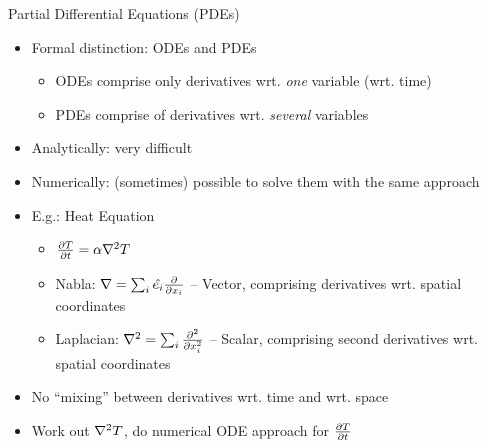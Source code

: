 
\begin{frame}{Partial Differential Equations (PDEs)}
%
\begin{itemize}
\item Formal distinction: ODEs and PDEs
	\begin{itemize}
	\item ODEs comprise only derivatives wrt. \emph{one} variable (\eg wrt. time)
	\item PDEs comprise of derivatives wrt. \emph{several} variables
	\end{itemize}
\item Analytically: very difficult
\item Numerically: (sometimes) possible to solve them with the same approach
\item E.\;g.: Heat Equation
	\begin{itemize}
	\item $\pdv{T}{t} = \alpha \laplacian T$
	\item Nabla: $\nabla = \sum_i \hat{e_i} \pdv{x_i} $ -- Vector, comprising derivatives wrt. spatial coordinates
	\item Laplacian: $\laplacian = \sum_i \pdv[2]{x_i}$ -- Scalar, comprising second derivatives wrt. spatial coordinates
	\end{itemize}
\item No \enquote{mixing} between derivatives wrt. time and wrt. space
\item[\Thus] Work out $\laplacian T$, do numerical ODE approach for $\pdv{T}{t}$
\end{itemize}
%
\end{frame}